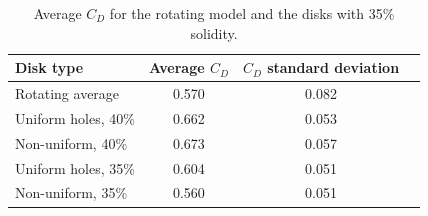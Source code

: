 \begin{table}
    \centering
    \begin{tabular}{l c c r}
         Disk type & Average $C_D$ & $C_D$ standard deviation \\
         \hline
         Rotating average & 0.570 & 0.082 \\
         Uniform holes, 40\% & 0.662 & 0.053 \\
         Non-uniform, 40\% & 0.673 & 0.057 \\
         Uniform holes, 35\% & 0.604 & 0.051 \\
         Non-uniform, 35\% & 0.560 & 0.051 \\
    \end{tabular}
    \caption{Average $C_D$ for the rotating model and the disks with 35\% solidity.}
    \label{tab:AvgCD}
\end{table}














